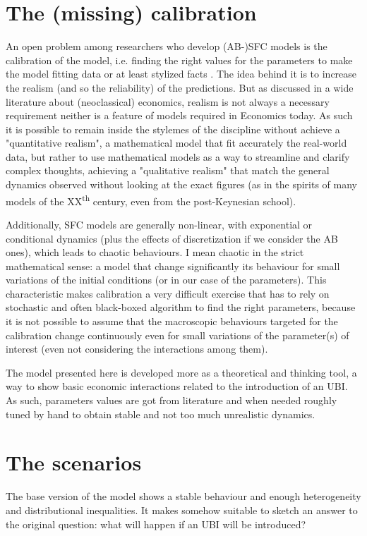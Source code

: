 \documentclass[]{article}
\begin{document}
\section{The (missing) calibration}
An open problem among researchers who develop (AB-)SFC models is the calibration of the model, i.e. finding the right values for the parameters to make the model fitting data or at least stylized facts \parencite{fagiolo2019a, grazzini2017a, zezza2019}.
The idea behind it is to increase the realism (and so the reliability) of the predictions. But as discussed in a wide literature about (neoclassical) economics, realism is not always a necessary requirement neither is a feature of models required in Economics today.
As such it is possible to remain inside the stylemes of the discipline without achieve a "quantitative realism", a mathematical model that fit accurately the real-world data, but rather to use mathematical models as a way to streamline and clarify complex thoughts, achieving a "qualitative realism" that match the general dynamics observed without looking at the exact figures (as in the spirits of many models of the XX\textsuperscript{th} century, even from the post-Keynesian school).

Additionally, SFC models are generally non-linear, with exponential or conditional dynamics (plus the effects of discretization if we consider the AB ones), which leads to chaotic behaviours. I mean chaotic in the strict mathematical sense: a model that change significantly its behaviour for small variations of the initial conditions (or in our case of the parameters).
This characteristic makes calibration a very difficult exercise that has to rely on stochastic and often black-boxed algorithm to find the right parameters, because it is not possible to assume that the macroscopic behaviours targeted for the calibration change continuously even for small variations of the parameter(s) of interest (even not considering the interactions among them).

The model presented here is developed more as a theoretical and thinking tool, a way to show basic economic interactions related to the introduction of an UBI.
As such, parameters values are got from literature and when needed roughly tuned by hand to obtain stable and not too much unrealistic dynamics.

\section{The scenarios}
The base version of the model shows a stable behaviour and enough heterogeneity and distributional inequalities. It makes somehow suitable to sketch an answer to the original question: what will happen if an UBI will be introduced?
\end{document}
